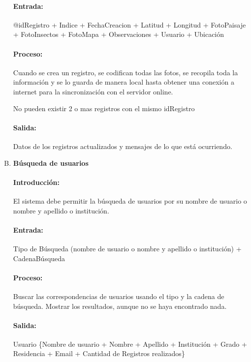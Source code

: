 \begin{enumerate}[A.]
        \paragraph{Entrada:} @idRegistro + Indice + FechaCreacion + Latitud + Longitud + FotoPaisaje + FotoInsectos + FotoMapa + Observaciones + Usuario + Ubicación 
        
        \paragraph{Proceso:} Cuando se crea un registro, se codifican todas las fotos, se recopila toda la información y se lo guarda de manera local hasta obtener una conexión a internet para la sincronización con el servidor online.

        No pueden existir 2 o mas registros con el mismo idRegistro
        
        \paragraph{Salida:} Datos de los registros actualizados y mensajes de lo que está ocurriendo.
        
        \item \textbf{Búsqueda de usuarios}
        
        \paragraph{Introducción:}El sistema debe permitir la búsqueda de usuarios por su nombre de usuario o nombre y apellido o institución. 
        
        \paragraph{Entrada:} Tipo de Búsqueda (nombre de usuario o nombre y apellido o institución) + CadenaBúsqueda
        
        \paragraph{Proceso:} Buscar las correspondencias de usuarios usando el tipo y la cadena de búsqueda. Mostrar los resultados, aunque no se haya encontrado nada.
        
        \paragraph{Salida:} Usuario \{Nombre de usuario + Nombre + Apellido + Institución + Grado + Residencia + Email + Cantidad de Registros realizados\}
        

\end{enumerate}
